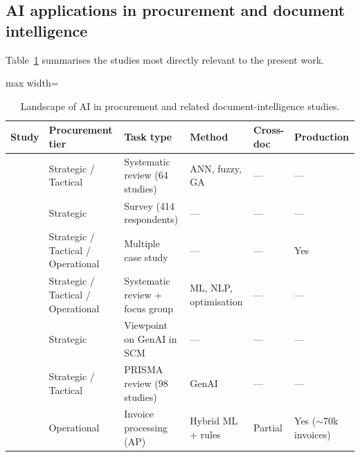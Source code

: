 \subsection{AI applications in procurement and document intelligence}
\label{sec:lr:sota:procurement}

Table~\ref{tab:lr:landscape} summarises the studies most directly relevant to the present work.

\begin{table}[htbp]
\centering
\caption{Landscape of AI in procurement and related document-intelligence studies.}
\label{tab:lr:landscape}
\footnotesize
\begin{adjustbox}{max width=\textwidth}
\begin{tabular}{@{}p{2.6cm}p{2.3cm}p{3.1cm}p{2.7cm}p{1.1cm}p{2.1cm}@{}}
\toprule
\textbf{Study} & \textbf{Procurement tier} & \textbf{Task type} & \textbf{Method} & \textbf{Cross-doc} & \textbf{Production} \\
\midrule
\citet{toorajipour2021}   & Strategic / Tactical               & Systematic review (64 studies)                          & ANN, fuzzy, GA                       & ---     & ---                       \\
\citet{bienhaus2018}      & Strategic                          & Survey (414 respondents)                                & ---                                  & ---     & ---                       \\
\citet{allalcherif2021}   & Strategic / Tactical / Operational & Multiple case study                                     & ---                                  & ---     & Yes                       \\
\citet{guida2023}         & Strategic / Tactical / Operational               & Systematic review + focus group                         & ML, NLP, optimisation                & ---     & ---                       \\
\citet{frederico2023}     & Strategic                          & Viewpoint on GenAI in SCM                               & ---                                  & ---     & ---                       \\
\citet{bahroun2026}       & Strategic / Tactical               & PRISMA review (98 studies)                              & GenAI                                & ---     & ---                       \\
\citet{kanaparthi2023}    & Operational                        & Invoice processing (AP)                                 & Hybrid ML + rules                    & Partial & Yes ($\sim$70k invoices)  \\

\end{tabular}
\end{adjustbox}
\end{table}

